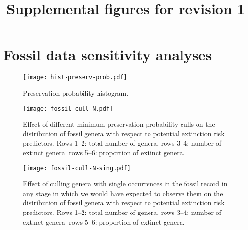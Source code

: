\documentclass[11pt]{article}
\title{Supplemental figures for revision 1}
\author{}
\begin{document}
\maketitle

\section{Fossil data sensitivity analyses}

\begin{figure}[htbp]
\begin{center}
\texttt{[image: hist-preserv-prob.pdf]}
\caption{Preservation probability histogram.}
\label{fig:hist-preserv-prob}
\end{center}
\end{figure}

\clearpage

\begin{figure}[htbp]
\begin{center}
\texttt{[image: fossil-cull-N.pdf]}
\caption{Effect of different minimum preservation probability culls on the distribution of fossil genera with respect to potential extinction risk predictors. Rows 1--2: total number of genera, rows 3--4: number of extinct genera, rows 5--6: proportion of extinct genera.}
\end{center}
\end{figure}

\clearpage

\begin{figure}[htbp]
\begin{center}
\texttt{[image: fossil-cull-N-sing.pdf]}
\caption{Effect of culling genera with single occurrences in the fossil record in any stage in which we would have expected to observe them on the distribution of fossil genera with respect to potential extinction risk predictors. Rows 1--2: total number of genera, rows 3--4: number of extinct genera, rows 5--6: proportion of extinct genera.}
\end{center}
\end{figure}

\clearpage

\end{document}
